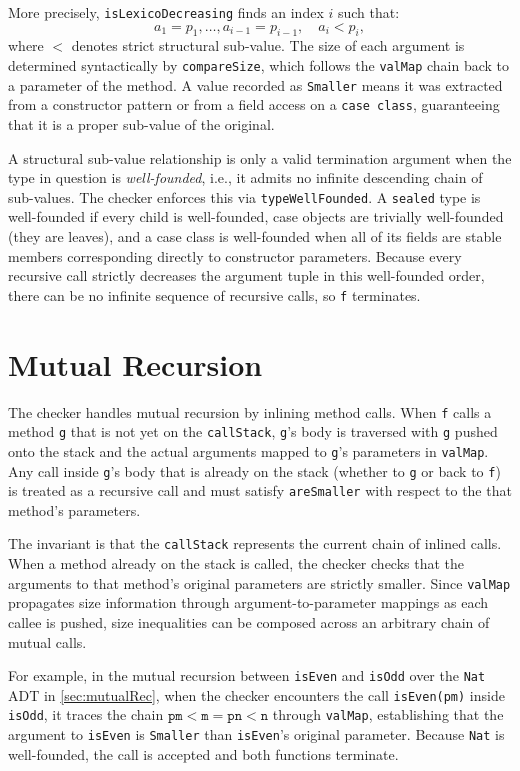 More precisely, \texttt{isLexicoDecreasing} finds an index $i$ such that:
$$ a_1 = p_1, \ldots, a_{i-1} = p_{i-1},\quad a_i < p_i, $$
where $<$ denotes strict structural sub-value. The size of each argument is
determined syntactically by \texttt{compareSize}, which follows the
\texttt{valMap} chain back to a parameter of the method. A value recorded as
\texttt{Smaller} means it was extracted from a constructor pattern or from a
field access on a \texttt{case class}, guaranteeing that it is a proper
sub-value of the original.

A structural sub-value relationship is only a valid termination argument when
the type in question is \emph{well-founded}, i.e., it admits no infinite
descending chain of sub-values. The checker enforces this via
\texttt{typeWellFounded}. A \texttt{sealed} type is well-founded if every child
is well-founded, case objects are trivially well-founded (they are leaves), and
a case class is well-founded when all of its fields are stable members
corresponding directly to constructor parameters. Because every recursive call
strictly decreases the argument tuple in this well-founded order, there can be
no infinite sequence of recursive calls, so \texttt{f} terminates.


\section{Mutual Recursion}
The checker handles mutual recursion by inlining method calls. When \texttt{f}
calls a method \texttt{g} that is not yet on the \texttt{callStack},
\texttt{g}'s body is traversed with \texttt{g} pushed onto the stack and the
actual arguments mapped to \texttt{g}'s parameters in \texttt{valMap}. Any call
inside \texttt{g}'s body that is already on the stack (whether to \texttt{g} or
back to \texttt{f}) is treated as a recursive call and must satisfy
\texttt{areSmaller} with respect to the that method's parameters.

The invariant is that the \texttt{callStack} represents the current
chain of inlined calls. When a method already on the stack is called, the
checker checks that the arguments to that method's original parameters are
strictly smaller. Since \texttt{valMap} propagates size information through
argument-to-parameter mappings as each callee is pushed, size inequalities can
be composed across an arbitrary chain of mutual calls.

For example, in the mutual recursion between \texttt{isEven} and
\texttt{isOdd} over the \texttt{Nat} ADT in \autoref{sec:mutualRec}, when the
checker encounters the call \texttt{isEven(pm)} inside \texttt{isOdd}, it traces
the chain $\texttt{pm} < \texttt{m} = \texttt{pn} < \texttt{n}$ through
\texttt{valMap}, establishing that the argument to \texttt{isEven} is
\texttt{Smaller} than \texttt{isEven}'s original parameter. Because \texttt{Nat}
is well-founded, the call is accepted and both functions terminate.

